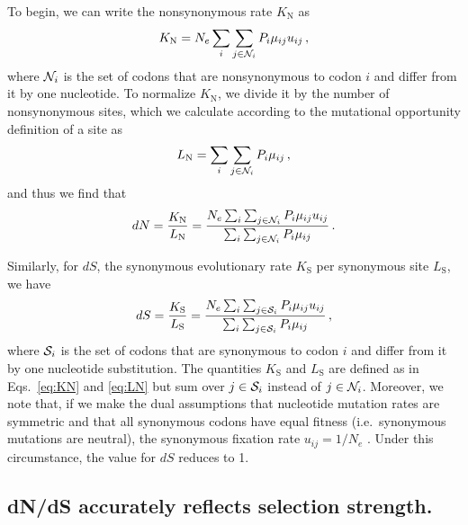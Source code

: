 \documentclass{pnastwo}
\begin{document}
\begin{article}
To begin, we can write the nonsynonymous rate $K_\text{N}$ as 
\begin{equation}\label{eq:KN}
	K_\text{N} = N_e \sum_i \sum_{j \in {\cal N}_i} P_i \mu_{ij} u_{ij} \,,
\end{equation}
where ${\cal N}_i$ is the set of codons that are nonsynonymous to codon $i$ and differ from it by one nucleotide. To normalize $K_\text{N}$, we divide it by the number of nonsynonymous sites, which we calculate according to the mutational opportunity definition of a site \cite{GoldmanYang1994, Yang2006} as 
\begin{equation}\label{eq:LN}
	L_\text{N} = \sum_i \sum_{j \in {\cal N}_i} P_i \mu_{ij}\,, 
\end{equation} and thus we find that 
\begin{equation}\label{eq:dN}
	dN = \frac{K_\text{N}}{L_\text{N}}=\frac{N_e \sum_i \sum_{j \in {\cal N}_i} P_i \mu_{ij} u_{ij} } {\sum_i \sum_{j \in {\cal N}_i}P_i \mu_{ij}}\,.
\end{equation}
		
Similarly, for $dS$, the synonymous evolutionary rate $K_\text{S}$ per synonymous site $L_\text{S}$, we have
\begin{equation}\label{eq:dS}
	dS = \frac{K_\text{S}}{L_\text{S}}=\frac{ N_e \sum_i \sum_{j \in {\cal S}_i} P_i \mu_{ij} u_{ij} } {\sum_i \sum_{j \in {\cal S}_i} P_i \mu_{ij} }\,,
\end{equation}
where ${\cal S}_i$ is the set of codons that are synonymous to codon $i$ and differ from it by one nucleotide substitution. The quantities $K_\text{S}$ and $L_\text{S}$ are defined as in Eqs.~\eqref{eq:KN} and \eqref{eq:LN} but sum over $j\in {\cal S}_i$ instead of $j\in {\cal N}_i$. Moreover, we note that, if we make the dual assumptions that nucleotide mutation rates are symmetric and that all synonymous codons have equal fitness (i.e.\ synonymous mutations are neutral), the synonymous fixation rate $u_{ij}= 1/N_e$ \cite{CrowKimura1970}. Under this circumstance, the value for $dS$ reduces to 1.
		
				
\subsection*{dN/dS accurately reflects selection strength.}


\end{article}
\end{document}
